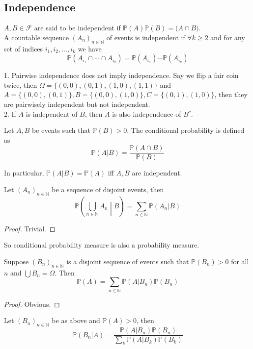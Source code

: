 \subsection{Independence}
\begin{definition}
    $A,B\in\mathscr F$ are said to be independent if $\mathbb P(A)\mathbb P(B)=\mathbb (A\cap B)$.\\
    A countable sequence $(A_n)_{n\in\mathbb N}$ of events is independent if $\forall k\ge 2$ and for any set of indices $i_1,i_2,\ldots,i_k$ we have
    $$\mathbb P(A_{i_1}\cap\cdots\cap A_{i_k})=\mathbb P(A_{i_1})\cdots\mathbb P(A_{i_k})$$
\end{definition}
\begin{remark}
    1. Pairwise independence does not imply independence.
    Say we flip a fair coin twice, then $\Omega=\{(0,0),(0,1),(1,0),(1,1)\}$ and $A=\{(0,0),(0,1)\},B=\{(0,0),(1,0)\},C=\{(0,1),(1,0)\}$, then they are pairwisely independent but not independent.\\
    2. If $A$ is independent of $B$, then $A$ is also independence of $B^c$.
\end{remark}
\begin{definition}
    Let $A,B$ be events such that $\mathbb P(B)>0$.
    The conditional probability is defined as
    $$\mathbb P(A|B)=\frac{\mathbb P(A\cap B)}{\mathbb P(B)}$$
\end{definition}
In particular, $\mathbb P(A|B)=\mathbb P(A)$ iff $A,B$ are independent.
\begin{proposition}
    Let $(A_n)_{n\in\mathbb N}$ be a sequence of disjoint events, then
    $$\mathbb P\left( \bigcup_{n\in\mathbb N}A_n\middle|B \right)=\sum_{n\in\mathbb N}\mathbb P(A_n|B)$$
\end{proposition}
\begin{proof}
    Trivial.
\end{proof}
So conditional probability measure is also a probability measure.
\begin{theorem}
    Suppose $(B_n)_{n\in\mathbb N}$ is a disjoint sequence of events such that $\mathbb P(B_n)>0$ for all $n$ and $\bigcup B_n=\Omega$.
    Then
    $$\mathbb P(A)=\sum_{n\in\mathbb N}\mathbb P(A|B_n)\mathbb P(B_n)$$
\end{theorem}
\begin{proof}
    Obvious.
\end{proof}
\begin{theorem}
    Let $(B_n)_{n\in\mathbb N}$ be as above and $\mathbb P(A)>0$, then
    $$\mathbb P(B_n|A)=\frac{\mathbb P(A|B_n)\mathbb P(B_n)}{\sum_{k}\mathbb P(A|B_k)\mathbb P(B_k)}$$
\end{theorem}
